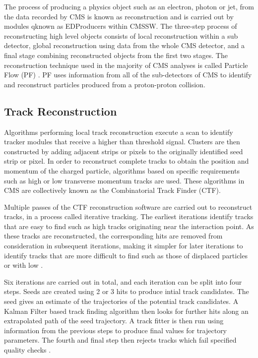 The process of producing a physics object such as an electron, photon or jet, from the data recorded by CMS is
known as reconstruction and is carried out by modules qknown as EDProducers within CMSSW. The three-step
process of reconstructing high level objects consists of local reconstruction within a sub detector, global
reconstruction using data from the whole CMS detector, and a final stage combining reconstructed objects from
the first two stages. The reconstruction technique used in the majority of CMS analyses is called Particle
Flow (PF) \cite{particle_flow}. PF uses information from all of the sub-detectors of CMS to identify and reconstruct
particles produced from a proton-proton collision.

\subsection{Track Reconstruction}
\label{ss:track_reconstruction}
Algorithms performing local track reconstruction execute a scan to identify tracker modules that receive a
higher than threshold signal. Clusters are then constructed by adding adjacent strips or pixels to the
originally identified seed strip or pixel. In order to reconstruct complete tracks to obtain the position and
momentum of the charged particle, algorithms based on specific requirements such as high or low transverse
momentum tracks are used. These algorithms in CMS are collectively known as the Combinatorial Track Finder
(CTF).

Multiple passes of the CTF reconstruction software are carried out to reconstruct tracks, in a process called
iterative tracking. The earliest iterations identify tracks that are easy to find such as high \pt tracks
originating near the interaction point. As these tracks are reconstructed, the corresponding hits are removed
from consideration in subsequent iterations, making it simpler for later iterations to identify tracks that
are more difficult to find such as those of displaced particles or with low \pt.

Six iterations are carried out in total, and each iteration can be split into four steps. Seeds are created
using 2 or 3 hits to produce intial track candidates. The seed gives an estimate of the trajectories of the
potential track candidates. A Kalman Filter \cite{kalman_filter, Speer:927395} based track finding algorithm
then looks for further hits along an extrapolated path of the seed trajectory. A track fitter is then run
using information from the previous steps to produce final values for trajectory parameters. The fourth and
final step then rejects tracks which fail specified quality checks \cite{track_reconstruction}.

